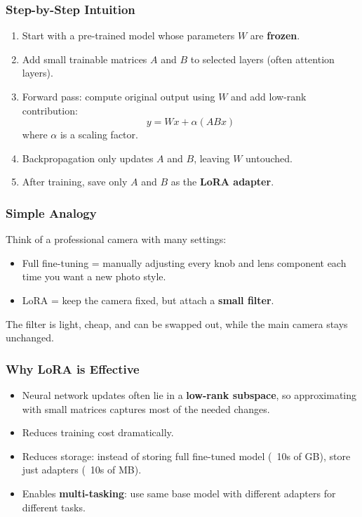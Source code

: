 \subsubsection{Step-by-Step Intuition}
\begin{enumerate}
    \item Start with a pre-trained model whose parameters $W$ are \textbf{frozen}.
    \item Add small trainable matrices $A$ and $B$ to selected layers (often attention layers).
    \item Forward pass: compute original output using $W$ and add low-rank contribution:  
    \[
    y = W x + \alpha (A B x)
    \]
    where $\alpha$ is a scaling factor.
    \item Backpropagation only updates $A$ and $B$, leaving $W$ untouched.
    \item After training, save only $A$ and $B$ as the \textbf{LoRA adapter}.
\end{enumerate}

\subsubsection{Simple Analogy}
\begin{tcolorbox}[colback=green!5!white,colframe=green!75!black,title=Analogy]
Think of a professional camera with many settings:

\begin{itemize}
    \item Full fine-tuning = manually adjusting every knob and lens component each time you want a new photo style.
    \item LoRA = keep the camera fixed, but attach a \textbf{small filter}. 
\end{itemize}

The filter is light, cheap, and can be swapped out, while the main camera stays unchanged.
\end{tcolorbox}

\subsubsection{Why LoRA is Effective}
\begin{itemize}
    \item Neural network updates often lie in a \textbf{low-rank subspace}, so approximating with small matrices captures most of the needed changes.
    \item Reduces training cost dramatically.
    \item Reduces storage: instead of storing full fine-tuned model (~10s of GB), store just adapters (~10s of MB).
    \item Enables \textbf{multi-tasking}: use same base model with different adapters for different tasks.
\end{itemize}

